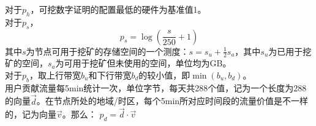 对于$p_h$，可挖数字证明的配置最低的硬件为基准值1。\\

对于$p_s$，
 $$p_s = \log{(\frac{s}{250}+1)}$$
其中$s$为节点可用于挖矿的存储空间的一个测度：$s = s_u + \frac{1}{2}s_a$，其中$s_u$为已用于挖矿的空间，$s_a$为可用于挖矿但未使用的空间，单位均为GB。\\

对于$p_b$，取上行带宽$b_u$和下行带宽$b_d$的较小值，即$\min(b_u, b_d)$。\\

用户贡献流量每5min统计一次，单位字节，每天共288个值，记为一个长度为288的向量$\vec{d}$。在节点所处的地域/时区，每个5min所对应时间段的流量价值是不一样的，记为向量$\vec{v}$。那么：
$p_d = \vec{d} \cdot \vec{v}$
